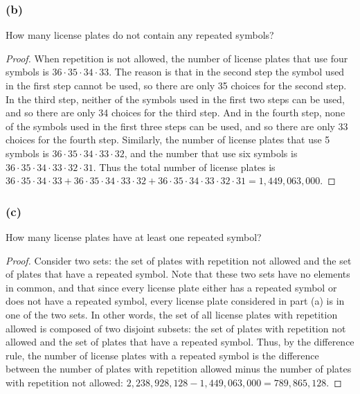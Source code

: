 \documentclass[14pt]{extarticle}
\begin{document}
\subsubsection{(b)}
How many license plates do not contain any repeated symbols?

\begin{proof}
     When repetition is not allowed, the number of license plates that use four symbols is \(36 \cdot 35 \cdot 34
     \cdot 33\). The reason is that in the second step the symbol used in the first step cannot be used, so there are
     only 35 choices for the second step. In the third step, neither of the symbols used in the first two steps can be
     used, and so there are only 34 choices for the third step. And in the fourth step, none of the symbols used in the
     first three steps can be used, and so there are only 33 choices for the fourth step. Similarly, the number of
     license plates that use 5 symbols is \(36 \cdot 35 \cdot 34 \cdot 33 \cdot 32\), and the number that use six symbols is
     \(36 \cdot 35 \cdot 34 \cdot 33 \cdot 32 \cdot 31\). Thus the total number of license plates is \(36 \cdot 35 \cdot
     34 \cdot 33 + 36 \cdot 35 \cdot 34 \cdot 33 \cdot 32 + 36 \cdot 35 \cdot 34 \cdot 33 \cdot 32 \cdot 31 =
     1,449,063,000\).
\end{proof}

\subsubsection{(c)}
How many license plates have at least one repeated symbol?

\begin{proof}
     Consider two sets: the set of plates with repetition not allowed and the set of plates that have a repeated symbol.
     Note that these two sets have no elements in common, and that since every license plate either has a repeated symbol
     or does not have a repeated symbol, every license plate considered in part (a) is in one of the two sets. In other
     words, the set of all license plates with repetition allowed is composed of two disjoint subsets: the set of
     plates with repetition not allowed and the set of plates that have a repeated symbol. Thus, by the difference rule,
     the number of license plates with a repeated symbol is the difference between the number of plates with repetition
     allowed minus the number of plates with repetition not allowed: \(2,238,928,128 - 1,449,063,000 = 789,865,128\).
\end{proof}
\end{document}
